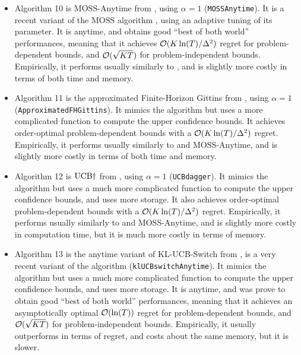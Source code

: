 \begin{itemize}
    \item Algorithm 10 is
    $\mathrm{MOSS}$-$\mathrm{Anytime}$ from \cite{Degenne16}, using $\alpha=1$ (\texttt{MOSSAnytime}).
    It is a recent variant of the $\mathrm{MOSS}$ algorithm \cite{BubeckSlivkins12}, using an adaptive tuning of its parameter. It is anytime, and obtains good ``best of both world'' performances, meaning that it achieves $\mathcal{O}(K\ln(T)/\Delta^2)$ regret for problem-dependent bounds, and $\mathcal{O}(\sqrt{KT})$ for problem-independent bounds.
    Empirically, it performs usually similarly to \UCB, and is slightly more costly in terms of both time and memory.

    \item Algorithm 11 is
    the approximated Finite-Horizon Gittins from \cite{Lattimore16a}, using $\alpha=1$ (\texttt{ApproximatedFHGittins}).
    It mimics the \UCB{} algorithm but uses a more complicated function to compute the upper confidence bounds.
    It achieves order-optimal problem-dependent bounds with a $\mathcal{O}(K\ln(T)/\Delta^2)$ regret.
    Empirically, it performs usually similarly to \UCB{} and $\mathrm{MOSS}$-$\mathrm{Anytime}$, and is slightly more costly in terms of both time and memory.

    \item Algorithm 12 is
    $\mathrm{UCB}\dagger$ from \cite{Lattimore2018refining}, using $\alpha=1$ (\texttt{UCBdagger}).
    It mimics the \UCB{} algorithm but uses a much more complicated function to compute the upper confidence bounds, and uses more storage.
    It also achieves order-optimal problem-dependent bounds with a $\mathcal{O}(K\ln(T)/\Delta^2)$ regret.
    Empirically, it performs usually similarly to \UCB{} and $\mathrm{MOSS}$-$\mathrm{Anytime}$, and is slightly more costly in computation time, but it is much more costly in terms of memory.

    \item Algorithm 13 is
    the anytime variant of KL-UCB-Switch from \cite{GarivierHadiji2018},
    is a very recent variant of the \klUCB{} algorithm \cite{KLUCBJournal}
    (\texttt{klUCBswitchAnytime}).
    It mimics the \klUCB{} algorithm but uses a much more complicated function to compute the upper confidence bounds, and uses more storage.
    It is anytime, and was prove to obtain good ``best of both world'' performances, meaning that it achieves an asymptotically optimal $\mathcal{O}(\ln(T))$ regret for problem-dependent bounds, and $\mathcal{O}(\sqrt{KT})$ for problem-independent bounds.
    Empirically, it usually outperforms \klUCB{} in terms of regret, and costs about the same memory, but it is slower.


\end{itemize}
